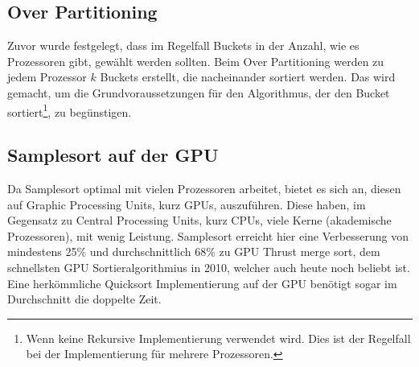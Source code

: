 	\subsection{Over Partitioning}
		Zuvor wurde festgelegt, dass im Regelfall Buckets in der Anzahl, wie es Prozessoren gibt, gewählt werden sollten.
		Beim Over Partitioning werden zu jedem Prozessor $k$ Buckets erstellt, die nacheinander sortiert werden.
		Das wird gemacht, um die Grundvoraussetzungen für den Algorithmus, der den Bucket sortiert\footnote{Wenn keine Rekursive Implementierung verwendet wird. Dies ist der Regelfall bei der Implementierung für mehrere Prozessoren.}, zu begünstigen.
	
	\subsection{Samplesort auf der GPU}
		Da Samplesort optimal mit vielen Prozessoren arbeitet, bietet es sich an, diesen auf Graphic Processing Units, kurz GPUs, auszuführen.
		Diese haben, im Gegensatz zu Central Processing Units, kurz CPUs, viele Kerne (akademische Prozessoren), mit wenig Leistung. \autocite{wikipedia-contributors-2022B}
		Samplesort erreicht hier eine Verbesserung von mindestens 25\% und durchschnittlich 68\% zu GPU Thrust merge sort, \autocite{leischner-2010} dem schnellsten GPU Sortieralgorithmius in 2010, welcher auch heute noch beliebt ist. \autocite{unknown-author-2016}
		Eine herkömmliche Quicksort Implementierung auf der GPU benötigt sogar im Durchschnitt die doppelte Zeit.
